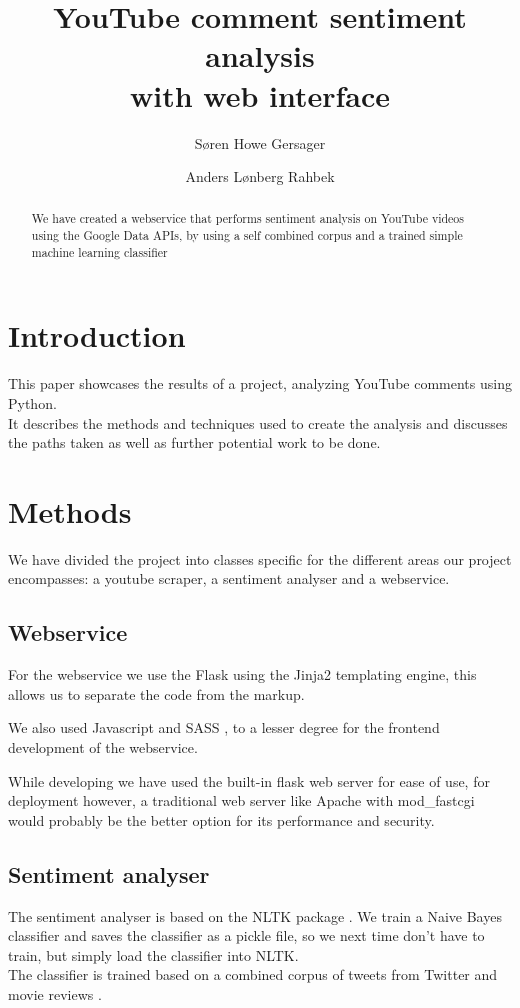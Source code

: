 \documentclass[conference]{IEEEtran}
\title{YouTube comment sentiment analysis \\with web interface}
\author{Søren Howe Gersager \\ \IEEEauthorblockN{s094557}
\IEEEauthorblockA{Technical University of Denmark}
\and
Anders Lønberg Rahbek \\ \IEEEauthorblockN{s107029}
\IEEEauthorblockA{Technical University of Denmark}
}
\begin{document}
\maketitle

\begin{abstract}
We have created a webservice that performs sentiment analysis on 
YouTube videos using the Google Data APIs, 
by using a self combined corpus and a trained simple machine learning classifier
\end{abstract}

\section{Introduction}
This paper showcases the results of a project, analyzing YouTube comments using Python. \\
It describes the methods and techniques used to create the analysis and discusses the paths taken as well as further potential work to be done.

\section{Methods}

We have divided the project into classes specific for the different areas our project encompasses: a youtube scraper, a sentiment analyser and a webservice.

\subsection{Webservice}
For the webservice we use the Flask \cite{flask} using the Jinja2 \cite{jinja2} templating engine, this allows us to separate the code from the markup.

We also used Javascript and SASS \cite{sass},  to a lesser degree for the frontend development of the webservice.

While developing we have used the built-in flask web server for ease of use, for deployment however, a traditional web server like Apache with mod\_fastcgi would probably be the better option for its performance and security.

\subsection{Sentiment analyser}
The sentiment analyser is based on the NLTK package \cite{nltk}. We train a Naive Bayes classifier and saves the classifier as a pickle file, so we next time don't  have to train, but simply load the classifier into NLTK. \\
The classifier is trained based on a combined corpus of tweets from Twitter \cite{twitter} and movie reviews \cite{movie_corpus}. \\
\end{document}
